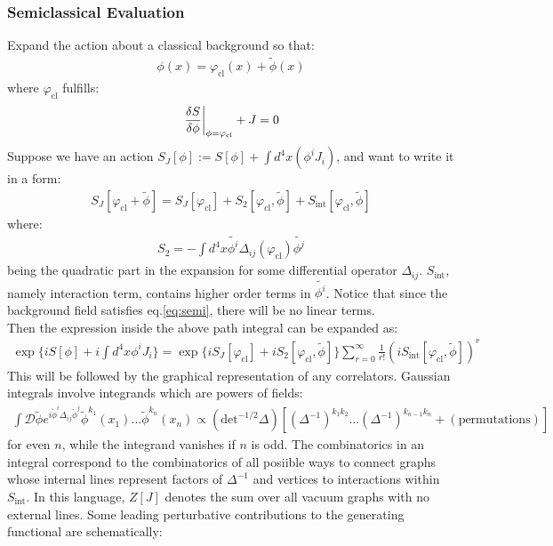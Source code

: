 \subsubsection{Semiclassical Evaluation}
Expand the action about a classical background so that:
\begin{align}
    \phi(x) = \varphi_{\text{cl}} (x) + \tilde{\phi}(x) 
\end{align}
where $\varphi_{\text{cl}}$ fulfills:
\begin{align}
    \label{eq:semi}
    \eval {\fdv{S}{\phi}}_{\phi = \varphi_{\text{cl}}} + J = 0
\end{align}
Suppose we have an action $S_{J}[\phi] := S[\phi] + \int d^{4}x (\phi ^{i} J_{i})$, and want to write it in a form:
\begin{align}
    S_{J} [\varphi_{\text{cl}} + \tilde{\phi}] = S_{J}[\varphi _{\text{cl}}] + S_{2} [\varphi _{\text{cl}}, \tilde{\phi}] + S_{\text{int}}[\varphi_{\text{cl}}, \tilde{\phi}]
\end{align} 
where:
\begin{align}
    S_{2} = -\int d^{4} x \tilde{\phi^{i}}\Delta _{ij}(\varphi_{\text{cl}}) \tilde{\phi ^{j}}
\end{align}
being the quadratic part in the expansion for some differential operator $\Delta _{ij}$. $S_{\text{int}}$, namely interaction term, contains higher order terms in $\tilde{\phi^{i}}$. Notice that since the background field satisfies eq.\ref{eq:semi}, there will be no linear terms. \\
\indent Then the expression inside the above path integral can be expanded as:
\begin{align}
    \exp \lbrace iS[\phi] + i\int d^{4}x \phi^{i}J_{i} \rbrace = \exp \lbrace iS_{J}[\varphi_{\text{cl}}]+ iS_{2} [\varphi_{\text{cl}}, \tilde{\phi}] \rbrace \sum_{r=0}^{\infty} \frac{1}{r!} (iS_{\text{int}}[\varphi_{\text{cl}},\tilde{\phi}])^{r}
\end{align}
This will be followed by the graphical representation of any correlators. Gaussian integrals involve integrands which are powers of fields:
\begin{align}
    \int \mathcal{D} \tilde{\phi} e^{i\tilde{\phi}^{i}\Delta _{ij} \tilde{\phi}^{j}} \tilde{\phi}^{k_{1}}(x_{1}) \dots \tilde{\phi}^{k_{n}} (x_{n}) \propto (\text{det}^{-1/2} \Delta) [(\Delta ^{-1})^{k_{1}k_{2}} \dots (\Delta ^{-1})^{k_{n-1}k_{n}} + (\text{permutations})]
\end{align}
for even $n$, while the integrand vanishes if $n$ is odd. The combinatorics in an integral correspond to the combinatorics of all posiible ways to connect graphs whose internal lines represent factors of $\Delta ^{-1}$ and vertices to interactions within $S_{\text{int}}$. In this language, $Z[J]$ denotes the sum over all vacuum graphs with no external lines. Some leading perturbative contributions to the generating functional are schematically:
